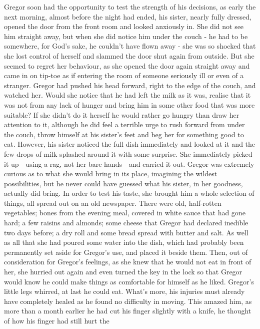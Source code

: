 \documentclass[12pt]{report}
\begin{document}
Gregor soon had the opportunity to test the strength of his decisions,
as early the next morning, almost before the night had ended, his
sister, nearly fully dressed, opened the door from the front room and
looked anxiously in. She did not see him straight away, but when she did
notice him under the couch - he had to be somewhere, for God's sake, he
couldn't have flown away - she was so shocked that she lost control of
herself and slammed the door shut again from outside. But she seemed to
regret her behaviour, as she opened the door again straight away and
came in on tip-toe as if entering the room of someone seriously ill or
even of a stranger. Gregor had pushed his head forward, right to the
edge of the couch, and watched her. Would she notice that he had left
the milk as it was, realise that it was not from any lack of hunger and
bring him in some other food that was more suitable? If she didn't do it
herself he would rather go hungry than draw her attention to it,
although he did feel a terrible urge to rush forward from under the
couch, throw himself at his sister's feet and beg her for something good
to eat. However, his sister noticed the full dish immediately and looked
at it and the few drops of milk splashed around it with some surprise.
She immediately picked it up - using a rag, not her bare hands - and
carried it out. Gregor was extremely curious as to what she would bring
in its place, imagining the wildest possibilities, but he never could
have guessed what his sister, in her goodness, actually did bring. In
order to test his taste, she brought him a whole selection of things,
all spread out on an old newspaper. There were old, half-rotten
vegetables; bones from the evening meal, covered in white sauce that had
gone hard; a few raisins and almonds; some cheese that Gregor had
declared inedible two days before; a dry roll and some bread spread with
butter and salt. As well as all that she had poured some water into the
dish, which had probably been permanently set aside for Gregor's use,
and placed it beside them. Then, out of consideration for Gregor's
feelings, as she knew that he would not eat in front of her, she hurried
out again and even turned the key in the lock so that Gregor would know
he could make things as comfortable for himself as he liked. Gregor's
little legs whirred, at last he could eat. What's more, his injuries
must already have completely healed as he found no difficulty in moving.
This amazed him, as more than a month earlier he had cut his finger
slightly with a knife, he thought of how his finger had still hurt the
\end{document}
